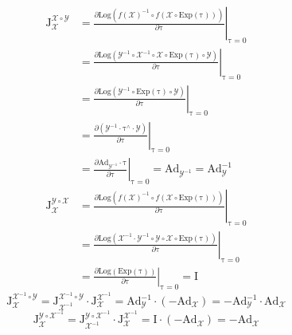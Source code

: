 \documentclass[12pt, onecolumn]{article}
\newcommand\liehat[1]{#1^{\land}}
\newcommand\Exp[1]{\mathrm{Exp}\left( #1\right) }
\newcommand\Log[1]{\mathrm{Log}\left( #1\right) }
\newcommand\bsm[1]{\boldsymbol{\mathrm{#1}}}
\begin{document}
	\begin{equation}
	\begin{aligned}
	\bsm{J}_{\mathcal{X}}^{\mathcal{X}\circ\mathcal{Y}}&=
	\left. \frac{\partial \Log{f(\mathcal{X})^{-1}\circ f(\mathcal{X}\circ\Exp{\bsm\tau})}}{\partial \bsm{\tau}}\right|_{\bsm{\tau}=0}
	\\&=\left. \frac{\partial \Log{\mathcal{Y}^{-1}\circ\mathcal{X}^{-1}\circ \mathcal{X}\circ\Exp{\bsm\tau}\circ\mathcal{Y}}}{\partial \bsm{\tau}}\right|_{\bsm{\tau}=0}
	\\&=\left. \frac{\partial \Log{\mathcal{Y}^{-1}\circ\Exp{\bsm\tau}\circ\mathcal{Y}}}{\partial \bsm{\tau}}\right|_{\bsm{\tau}=0}
	\\&=\left. \frac{\partial \left( \mathcal{Y}^{-1}\cdot\liehat{\bsm{\tau}}\cdot\mathcal{Y}\right) }{\partial \bsm{\tau}}\right|_{\bsm{\tau}=0}
	\\&=\left. \frac{\partial \bsm{Ad}_{\mathcal{Y}^{-1}}\cdot\bsm{\tau} }{\partial \bsm{\tau}}\right|_{\bsm{\tau}=0}=\bsm{Ad}_{\mathcal{Y}^{-1}}=\bsm{Ad}_{\mathcal{Y}}^{-1}
	\end{aligned}
	\end{equation}
	\vspace{5mm}
	\begin{equation}
	\begin{aligned}
	\bsm{J}_{\mathcal{X}}^{\mathcal{Y}\circ\mathcal{X}}&=
	\left. \frac{\partial \Log{f(\mathcal{X})^{-1}\circ f(\mathcal{X}\circ\Exp{\bsm\tau})}}{\partial \bsm{\tau}}\right|_{\bsm{\tau}=0}
	\\&=	\left. \frac{\partial \Log{\mathcal{X}^{-1}\cdot\mathcal{Y}^{-1}\circ \mathcal{Y}\circ\mathcal{X}\circ\Exp{\bsm\tau}}}{\partial \bsm{\tau}}\right|_{\bsm{\tau}=0}
	\\&=	\left. \frac{\partial \Log{\Exp{\bsm\tau}}}{\partial \bsm{\tau}}\right|_{\bsm{\tau}=0}=\bsm{I}
	\end{aligned}
	\end{equation}
	\vspace{5mm}
	\begin{equation}
	\bsm{J}_{\mathcal{X}}^{\mathcal{X}^{-1}\circ\mathcal{Y}}=
	\bsm{J}_{\mathcal{X}^{-1}}^{\mathcal{X}^{-1}\circ\mathcal{Y}}\cdot
	\bsm{J}_{\mathcal{X}}^{\mathcal{X}^{-1}}
	=\bsm{Ad}_{\mathcal{Y}}^{-1}\cdot\left( -\bsm{Ad}_{\mathcal{X}}\right) 
	=-\bsm{Ad}_{\mathcal{Y}}^{-1}\cdot\bsm{Ad}_{\mathcal{X}}
	\end{equation}
	\vspace{5mm}
	\begin{equation}
	\bsm{J}_{\mathcal{X}}^{\mathcal{Y}\circ\mathcal{X}^{-1}}=
	\bsm{J}_{\mathcal{X}^{-1}}^{\mathcal{Y}\circ\mathcal{X}^{-1}}\cdot
	\bsm{J}_{\mathcal{X}}^{\mathcal{X}^{-1}}
	=\bsm{I}\cdot\left( -\bsm{Ad}_{\mathcal{X}}\right) =-\bsm{Ad}_{\mathcal{X}}
	\end{equation}
\end{document}

